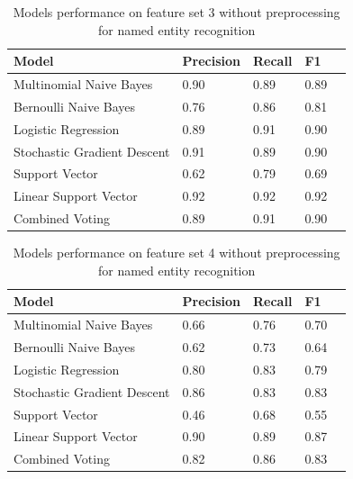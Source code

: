 \documentclass[11pt,oneside]{book}
\begin{document}
\begin{longtable}{|l|l|l|l|l|}
\caption{Models performance on feature set 3 without preprocessing for named entity recognition}
\label{tab:ner_feature_set_7}\\
\hline
\textbf{Model}          & \multicolumn{1}{c|}{\textbf{Precision}} & \multicolumn{1}{c|}{\textbf{Recall}} & \textbf{F1} \\ \hline
\endfirsthead
%
\endhead
%
Multinomial Naive Bayes &  0.90  & 0.89  & 0.89      \\ \hline
Bernoulli Naive Bayes       & 0.76 & 0.86 & 0.81   \\ \hline
Logistic Regression         & 0.89 & 0.91 & 0.90  \\ \hline
Stochastic Gradient Descent & 0.91 & 0.89 & 0.90   \\ \hline
Support Vector              & 0.62 & 0.79 & 0.69   \\ \hline
Linear Support Vector       & 0.92 & 0.92 & 0.92   \\ \hline
Combined Voting             & 0.89 & 0.91 & 0.90   \\ \hline
\end{longtable}

\begin{longtable}{|l|l|l|l|l|}
\caption{Models performance on feature set 4 without preprocessing for named entity recognition}
\label{tab:ner_feature_set_8}\\
\hline
\textbf{Model}          & \multicolumn{1}{c|}{\textbf{Precision}} & \multicolumn{1}{c|}{\textbf{Recall}} & \textbf{F1} \\ \hline
\endfirsthead
%
\endhead
%
Multinomial Naive Bayes &  0.66  & 0.76  & 0.70     \\ \hline
Bernoulli Naive Bayes       & 0.62 & 0.73 & 0.64  \\ \hline
Logistic Regression         & 0.80 & 0.83 & 0.79  \\ \hline
Stochastic Gradient Descent & 0.86 & 0.83 & 0.83  \\ \hline
Support Vector              & 0.46 & 0.68 & 0.55  \\ \hline
Linear Support Vector       & 0.90 & 0.89 & 0.87  \\ \hline
Combined Voting             & 0.82 & 0.86 & 0.83  \\ \hline
\end{longtable}
\end{document}
